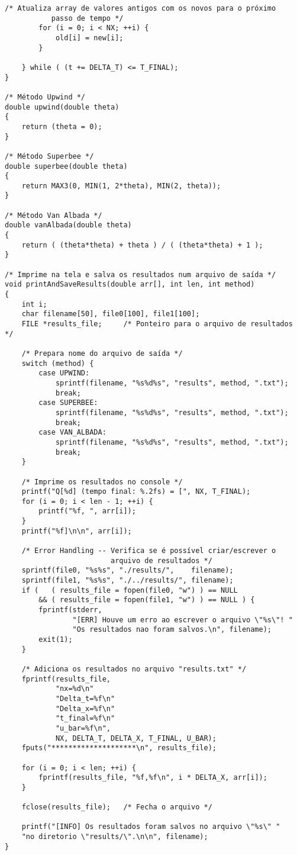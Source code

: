 \begin{Verbatim}[fontsize=\footnotesize]
        /* Atualiza array de valores antigos com os novos para o próximo
           passo de tempo */
        for (i = 0; i < NX; ++i) {
            old[i] = new[i];
        }

    } while ( (t += DELTA_T) <= T_FINAL);
}

/* Método Upwind */
double upwind(double theta)
{
    return (theta = 0);
}

/* Método Superbee */
double superbee(double theta)
{
    return MAX3(0, MIN(1, 2*theta), MIN(2, theta));
}

/* Método Van Albada */
double vanAlbada(double theta)
{
    return ( (theta*theta) + theta ) / ( (theta*theta) + 1 );
}

/* Imprime na tela e salva os resultados num arquivo de saída */
void printAndSaveResults(double arr[], int len, int method)
{
    int i;
    char filename[50], file0[100], file1[100];
    FILE *results_file;     /* Ponteiro para o arquivo de resultados */

    /* Prepara nome do arquivo de saída */
    switch (method) {
        case UPWIND:
            sprintf(filename, "%s%d%s", "results", method, ".txt");
            break;
        case SUPERBEE:
            sprintf(filename, "%s%d%s", "results", method, ".txt");
            break;
        case VAN_ALBADA:
            sprintf(filename, "%s%d%s", "results", method, ".txt");
            break;
    }

    /* Imprime os resultados no console */
    printf("Q[%d] (tempo final: %.2fs) = [", NX, T_FINAL);
    for (i = 0; i < len - 1; ++i) {
        printf("%f, ", arr[i]);
    }
    printf("%f]\n\n", arr[i]);

    /* Error Handling -- Verifica se é possível criar/escrever o
                         arquivo de resultados */
    sprintf(file0, "%s%s", "./results/",    filename);
    sprintf(file1, "%s%s", "./../results/", filename);
    if (   ( results_file = fopen(file0, "w") ) == NULL
        && ( results_file = fopen(file1, "w") ) == NULL ) {
        fprintf(stderr,
                "[ERR] Houve um erro ao escrever o arquivo \"%s\"! "
                "Os resultados nao foram salvos.\n", filename);
        exit(1);
    }

    /* Adiciona os resultados no arquivo "results.txt" */
    fprintf(results_file,
            "nx=%d\n"
            "Delta_t=%f\n"
            "Delta_x=%f\n"
            "t_final=%f\n"
            "u_bar=%f\n",
            NX, DELTA_T, DELTA_X, T_FINAL, U_BAR);
    fputs("********************\n", results_file);

    for (i = 0; i < len; ++i) {
        fprintf(results_file, "%f,%f\n", i * DELTA_X, arr[i]);
    }

    fclose(results_file);   /* Fecha o arquivo */

    printf("[INFO] Os resultados foram salvos no arquivo \"%s\" "
    "no diretorio \"results/\".\n\n", filename);
}
\end{Verbatim}

